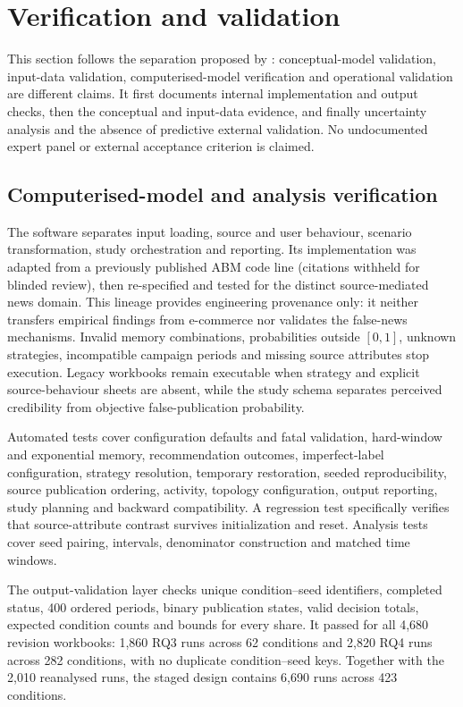 \section{Verification and validation}

This section follows the separation proposed by \citet{sargent2013}: conceptual-model validation, input-data validation, computerised-model verification and operational validation are different claims. It first documents internal implementation and output checks, then the conceptual and input-data evidence, and finally uncertainty analysis and the absence of predictive external validation. No undocumented expert panel or external acceptance criterion is claimed.

\subsection{Computerised-model and analysis verification}

The software separates input loading, source and user behaviour, scenario transformation, study orchestration and reporting. Its implementation was adapted from a previously published ABM code line \ifdefined\ANONYMOUS (citations withheld for blinded review)\else\citep{teranAl:jos2022,teranAl:tpc2025}\fi, then re-specified and tested for the distinct source-mediated news domain. This lineage provides engineering provenance only: it neither transfers empirical findings from e-commerce nor validates the false-news mechanisms. Invalid memory combinations, probabilities outside $[0,1]$, unknown strategies, incompatible campaign periods and missing source attributes stop execution. Legacy workbooks remain executable when strategy and explicit source-behaviour sheets are absent, while the study schema separates perceived credibility from objective false-publication probability.

Automated tests cover configuration defaults and fatal validation, hard-window and exponential memory, recommendation outcomes, imperfect-label configuration, strategy resolution, temporary restoration, seeded reproducibility, source publication ordering, activity, topology configuration, output reporting, study planning and backward compatibility. A regression test specifically verifies that source-attribute contrast survives initialization and reset. Analysis tests cover seed pairing, intervals, denominator construction and matched time windows.

The output-validation layer checks unique condition--seed identifiers, completed status, 400 ordered periods, binary publication states, valid decision totals, expected condition counts and bounds for every share. It passed for all 4,680 revision workbooks: 1,860 RQ3 runs across 62 conditions and 2,820 RQ4 runs across 282 conditions, with no duplicate condition--seed keys. Together with the 2,010 reanalysed runs, the staged design contains 6,690 runs across 423 conditions.

